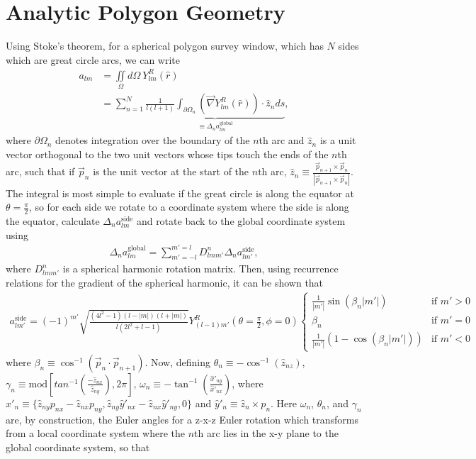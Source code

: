 \documentclass[a4paper,11pt]{article}
\begin{document}
\section{Analytic Polygon Geometry}
Using Stoke's theorem, for a spherical polygon survey window, which has $N$ sides which are great circle arcs, we can write 
\begin{align}\label{stokes_alm}
a_{l m}&=\iint\limits_\Omega d\Omega ~Y^R_{l m}(\hat{r})\\
 &=\sum_{n=1}^{N}\underbrace{\frac{1}{l(l+1)}\int_{\partial\Omega_n}\left(\vec{\nabla}Y^R_{l m}(\hat{r})\right)\cdot \hat{z}_n ds}_{\equiv\Delta_n a_{l m}^{\text{global}}},
\end{align}
where $\partial \Omega_n$ denotes integration over the boundary of the $n$th arc and $\hat{z}_n$ is a unit vector orthogonal to the two unit vectors whose tips touch the ends of the $n$th arc, such that if $\vec{p}_{n}$ is the unit vector at the start of the $n$th arc, $\hat{z}_n\equiv\frac{\vec{p}_{n+1} \times \vec{p}_{n}}{|\vec{p}_{n+1} \times \vec{p}_{n}|}$. The integral is most simple to evaluate if the great circle is along the equator at $\theta=\frac{\pi}{2}$, so for each side we rotate to a coordinate system where the side is along the equator, calculate $\Delta_n a_{l m}^{\text{side}}$ and rotate back to the global coordinate system using 
\begin{align}\label{harmonic_rotate}
\Delta_n a_{l m}^{\text{global}}=\sum_{m'=-l}^{m'=l}{D^n_{l m m'}\Delta_n a_{l m'}^{\text{side}}},
\end{align}
where $D^n_{l m m'}$ is a spherical harmonic rotation matrix. Then, using recurrence relations for the gradient of the spherical harmonic, it can be shown that
\begin{align}\label{harmonic_side}
a_{l m'}^{\text{side}} =(-1)^{m'}\sqrt{\frac{(4 l^2-1)(l-|m|)(l+|m|)}{l(2 l^2+l-1)}}Y^R_{(l-1) m'}\left(\theta=\frac{\pi}{2},\phi=0\right)
\begin{cases}
\frac{1}{|m'|}\sin(\beta_n |m'|) &\text{if } m'>0\\
\beta_n &\text{if }m'=0\\
\frac{1}{|m'|}(1-\cos(\beta_n |m'|)) &\text{if }m'<0
\end{cases}
\end{align}
where $\beta_n\equiv\cos^{-1}\left(\vec{p}_n\cdot\vec{p}_{n+1}\right)$. Now, defining $\theta_n\equiv-\cos^{-1}\left(\hat{z}_{n z}\right)$, $\gamma_n\equiv\text{mod}\left[tan^{-1}\left(\frac{-\hat{z}_{n x}}{\hat{z}_{n y}}\right), 2 \pi\right]$, $\omega_n\equiv-\tan^{-1}\left(\frac{\hat{x}'_{n y}}{\hat{x}'_{n x}}\right)$, where $\hat{x}'_n\equiv\{\hat{z}_{n y}p_{n x}-\hat{z}_{n x}p_{n y},\hat{z}_{n y} \hat{y}'_{n x}-\hat{z}_{n x}\hat{y}'_{n y},0\}$ and $\hat{y}'_n\equiv \hat{z}_n \times p_{n}$. Here $\omega_n$, $\theta_n$, and $\gamma_n$ are, by construction, the Euler angles for a z-x-z Euler rotation which transforms from a local coordinate system where the $n$th arc lies in the x-y plane to the global coordinate system, so that 
\end{document}
